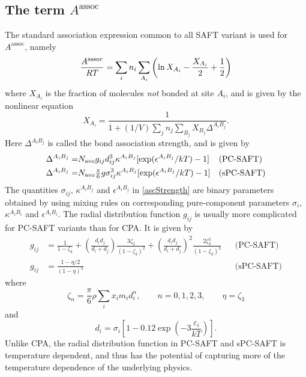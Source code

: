 \documentclass[internal,english]{sintefmemo2012}
\newcommand{\z}{\zeta}
\newcommand{\lp}{\left(}
\newcommand{\rp}{\right)}
\begin{document}
\subsection{The term $A^{\text{assoc}}$}
The standard association expression common to all SAFT variant is used for
$A^{\text{assoc}}$, namely
\begin{equation}
  \frac{A^{\rm assoc}}{RT} = \sum_{i} n_i \sum_{A_i} \lp \ln X_{A_i} - \frac{X_{A_i}}{2} + \frac{1}{2} \rp
\end{equation}
where $X_{A_i}$ is the fraction of molecules \textit{not} bonded at site $A_i$,
and is given by the nonlinear equation
\begin{equation}
  X_{A_i} = \frac{1}{1+(1/V) \sum_j n_j \sum_{B_j} X_{B_j} \Delta^{A_i B_j}}.
\end{equation}
Here $\Delta^{A_i B_j}$ is called the bond association strength, and is given by
\begin{align}
    \Delta^{A_i B_j} =& N_{\rm avo} g_{ij} d_{ij}^3 \kappa^{A_i B_j} [\exp(\epsilon^{A_i B_j}/kT) - 1] &&\text{(PC-SAFT)}\\ \label{ascStrength}
    \Delta^{A_i B_j} =& N_{\rm avo} \tfrac{\pi}{6} g \sigma_{ij}^3 \kappa^{A_i B_j} [\exp(\epsilon^{A_i B_j}/kT) - 1] &&\text{(sPC-SAFT)}
\end{align}
The quantities $\sigma_{ij}$, $\kappa^{A_i B_j}$ and $\epsilon^{A_i B_j}$ in
\eqref{ascStrength} are binary parameters obtained by using mixing rules on
corresponding pure-component parameters $\sigma_{i}$, $\kappa^{A_i B_i}$ and
$\epsilon^{A_i B_i}$. The radial distribution function $g_{ij}$ is usually more
complicated for PC-SAFT variants than for CPA. It is given by
\begin{align}
  g_{ij} &= \frac{1}{1-\z_3} + \lp \frac{d_id_j}{d_i+d_j} \rp \frac{3\z_2}{(1-\z_3)^2} + \lp \frac{d_i d_j}{d_i+d_j} \rp^2 \frac{2\z_2^2}{(1-\z_3)^2} && \text{(PC-SAFT)} \\ \label{gij}
  g_{ij} &= \frac{1-\eta/2}{(1-\eta)^3} && \text{(sPC-SAFT)}
\end{align}
where
\begin{equation}
  \label{eq:z_n}
  \z_n = \frac{\pi}{6} \rho \sum_i x_i m_i d_i^n, \qquad n = 0,1,2,3, \qquad \eta = \zeta_3
\end{equation}
and
\begin{equation}
  \label{eq:di}
  d_i = \sigma_i \left[1 - 0.12\exp \lp -3\frac{\varepsilon_i}{kT} \rp \right].
\end{equation}
Unlike CPA, the radial distribution function in PC-SAFT and sPC-SAFT is
temperature dependent, and thus has the potential of capturing more of the
temperature dependence of the underlying physics.
\end{document}
